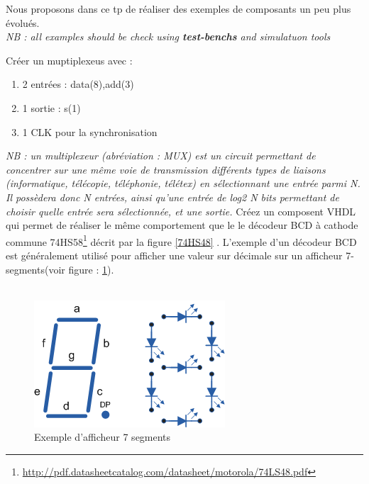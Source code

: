 \documentclass[12pt]{tdtp}
\begin{document}
\titre
Nous proposons dans ce tp de réaliser des exemples de composants un peu plus évolués.\\

\textit {NB : all examples should be check using \textbf{test-benchs} and simulatuon tools}

\Exo

Créer un muptiplexeus avec :
\begin{enumerate}
	\item 2 entrées : data(8),add(3)
	\item 1 sortie : s(1)
	\item 1 CLK pour la synchronisation
\end{enumerate}

\textit{NB : un multiplexeur (abréviation : MUX) est un circuit permettant de concentrer sur une même voie de transmission différents types de liaisons (informatique, télécopie, téléphonie, télétex) en sélectionnant une entrée parmi N. Il possèdera donc N entrées, ainsi qu'une entrée de log2 N bits permettant de choisir quelle entrée sera sélectionnée, et une sortie.}
\newpage
\Exo
Créez un composent VHDL qui permet de réaliser le même comportement que le le décodeur BCD à cathode commune 74HS58\footnote{\url{http://pdf.datasheetcatalog.com/datasheet/motorola/74LS48.pdf}} décrit par la figure \ref{74HS48} . 
L'exemple d'un décodeur BCD est généralement utilisé pour afficher une valeur sur décimale sur un afficheur 7-segments(voir figure : \ref{7seg}).\\
\\

\begin{figure}[h!]
\begin{center}
\includegraphics[scale=0.5]{images/7seg.png}
\caption{Exemple d'afficheur 7 segments}
\label{7seg}
\end{center}
\end{figure}
\end{document}
